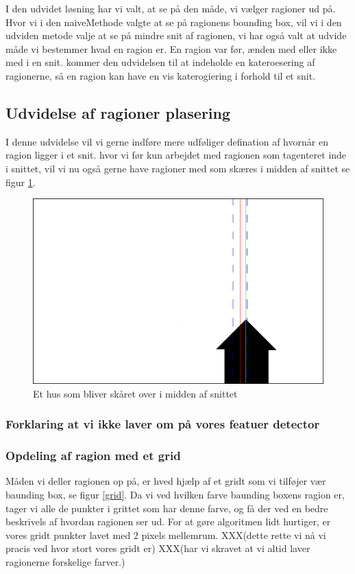 I den udvidet løsning har vi valt, at se på den måde, vi vælger ragioner
ud på. Hvor vi i den naiveMethode valgte at se på ragionens bounding
box, vil vi i den udviden metode valje at se på mindre snit af ragionen,
vi har også valt at udvide måde vi bestemmer hvad en ragion er. En
ragion var før, ænden med eller ikke med i en snit. kommer den udvidelsen
til at indeholde en kateroesering af ragionerne, så en ragion kan have
en vis katerogiering i forhold til et snit. 

\subsection{Udvidelse af ragioner plasering}
I denne udvidelse vil vi gerne indføre mere udføliger defination af
hvornår en ragion ligger i et snit. hvor vi før kun arbejdet med
ragionen som tagenteret inde i snittet, vil vi nu også gerne have
ragioner med som skæres i midden af snittet se figur
\ref{hus}.

\begin{figure}[h]
	\begin{center}
		\includegraphics[scale=0.3,angle=0]{afsnit/vores_implementation/billeder/udvidet_loesning/husworks.png}
	\end{center}
	\caption[]{Et hus som bliver skåret over i midden af snittet}
	\label{hus}
\end{figure}

\subsubsection{Forklaring at vi ikke laver om på vores featuer detector}


\subsubsection{Opdeling af ragion med et grid}
Måden vi deller ragionen op på, er hved hjælp af et gridt som vi
tilføjer vær baunding box, se figur \ref{grid}. Da vi ved hvilken farve
baunding boxens ragion er, tager vi alle de punkter i grittet som har
denne farve, og få der ved en bedre beskrivels af hvordan ragionen ser
ud. For at gøre algoritmen lidt hurtiger, er vores gridt punkter lavet
med 2 pixels mellemrum. XXX(dette rette vi nå vi pracis ved hvor stort
vores gridt er) XXX(har vi skravet at vi altid laver ragionerne
forskelige farver.)

